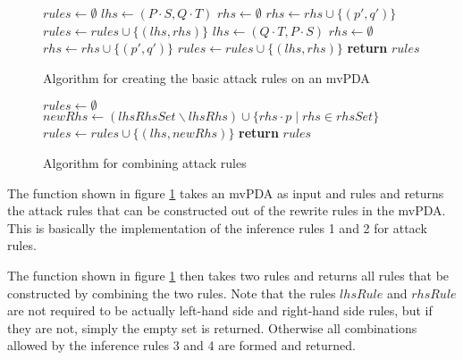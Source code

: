 \begin{figure}[H]
\begin{algorithmic}[1]
  \State $rules ← ∅$
      \State $lhs ← (P⋅S, Q⋅T)$
        \State $rhs ← ∅$
          \State $rhs ← rhs ∪ \{ (p', q') \}$
        \EndFor
        \State $rules ← rules ∪ \{(lhs, rhs)\}$
      \EndFor
      \State $lhs ← (Q⋅T, P⋅S)$
        \State $rhs ← ∅$
          \State $rhs ← rhs ∪ \{ (p', q') \}$
        \EndFor
        \State $rules ← rules ∪ \{(lhs, rhs)\}$
      \EndFor
  \EndFor
  \State \textbf{return} $rules$
\EndFunction
\end{algorithmic}
\label{alg:make-rules}
\caption{Algorithm for creating the basic attack rules on an mvPDA}
\end{figure}

\begin{figure}[H]
\begin{algorithmic}[1]
  \State $rules ← ∅$
      \State $newRhs ← (lhsRhsSet ∖ lhsRhs) ∪ \{ rhs⋅p \mid rhs ∈ rhsSet \}$
      \State $rules ← rules ∪ \{ (lhs, newRhs) \}$
    \EndFor
  \EndIf
  \State \textbf{return} $rules$
\EndFunction
\end{algorithmic}
\label{alg:rule-combining}
\caption{Algorithm for combining attack rules}
\end{figure}

The function {} shown in figure \ref{alg:make-rules}
takes an mvPDA as input and rules and returns the attack rules
that can be constructed out of the rewrite rules in the mvPDA.
This is basically the implementation of the inference rules 1 and 2
for attack rules.

The function {} shown in figure \ref{alg:make-rules}
then takes two rules and returns all rules that be constructed by
combining the two rules.
Note that the rules $lhsRule$ and $rhsRule$ are not required to
be actually left-hand side and right-hand side rules, but if they are
not, simply the empty set is returned.
Otherwise all combinations allowed by the inference rules 3 and 4
are formed and returned.

